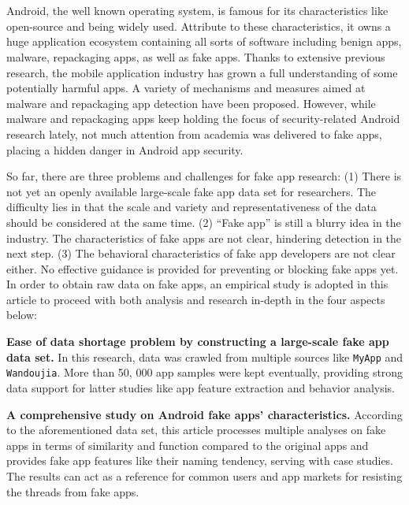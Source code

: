 \newpage
\cleardoublepage{}

\chapter*{}
\vspace{-5mm}


Android, the well known operating system, is famous for its characteristics like open-source and being widely used.
Attribute to these characteristics, it owns a huge application ecosystem containing all sorts of software including benign apps, malware, repackaging apps, as well as fake apps.
Thanks to extensive previous research, the mobile application industry has grown a full understanding of some potentially harmful apps.
A variety of mechanisms and measures aimed at malware and repackaging app detection have been proposed.
However, while malware and repackaging apps keep holding the focus of security-related Android research lately, not much attention from academia was delivered to fake apps, placing a hidden danger in Android app security.

So far, there are three problems and challenges for fake app research:
(1) There is not yet an openly available large-scale fake app data set for researchers. The difficulty lies in that the scale and variety and representativeness of the data should be considered at the same time.
(2) ``Fake app'' is still a blurry idea in the industry. The characteristics of fake apps are not clear,  hindering detection in the next step.
(3) The behavioral characteristics of fake app developers are not clear either. No effective guidance is provided for preventing or blocking fake apps yet.
In order to obtain raw data on fake apps, an empirical study is adopted in this article to proceed with both analysis and research in-depth in the four aspects below:

\textbf{Ease of data shortage problem by constructing a large-scale fake app data set. }
In this research, data was crawled from multiple sources like \texttt{MyApp} and \texttt{Wandoujia}.
More than 50, 000 app samples were kept eventually, providing strong data support for latter studies like app feature extraction and behavior analysis.

\textbf{A comprehensive study on Android fake apps' characteristics. }
According to the aforementioned data set, this article processes multiple analyses on fake apps in terms of similarity and function compared to the original apps and provides fake app features like their naming tendency, serving with case studies.
The results can act as a reference for common users and app markets for resisting the threads from fake apps.

